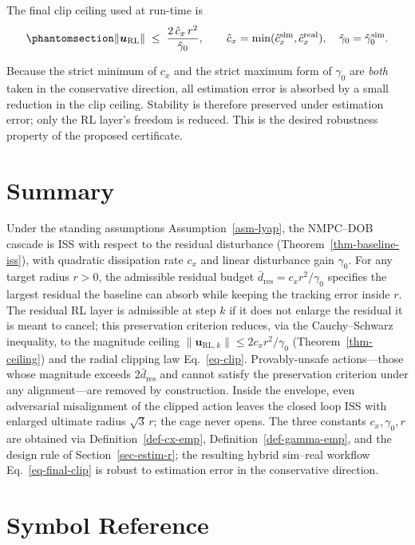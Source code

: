 \documentclass[
  11pt,
]{article}
\theoremstyle{plain}
\theoremstyle{plain}
\theoremstyle{definition}
\theoremstyle{remark}
\begin{document}
The final clip ceiling used at run-time is
\begin{equation}\protect\phantomsection\label{eq-final-clip}{
\|\bm{u}_{\mathrm{RL}}\|
\;\le\;
\frac{2\,\hat{c}_x\,r^2}{\hat{\gamma}_0},
\qquad
\hat{c}_x = \min(\hat{c}_x^{\mathrm{sim}}, \hat{c}_x^{\mathrm{real}}),
\quad
\hat{\gamma}_0 = \hat{\gamma}_0^{\mathrm{sim}}.
}\end{equation}

Because the strict minimum of \(c_x\) and the strict maximum form of
\(\gamma_0\) are \emph{both} taken in the conservative direction, all
estimation error is absorbed by a small reduction in the clip ceiling.
Stability is therefore preserved under estimation error; only the RL
layer's freedom is reduced. This is the desired robustness property of
the proposed certificate.

\section{Summary}\label{sec-summary}

Under the standing assumptions Assumption~\ref{asm-lyap}, the NMPC--DOB
cascade is ISS with respect to the residual disturbance
(Theorem~\ref{thm-baseline-iss}), with quadratic dissipation rate
\(c_x\) and linear disturbance gain \(\gamma_0\). For any target radius
\(r > 0\), the admissible residual budget
\(\bar{d}_{\mathrm{res}} = c_x r^2/\gamma_0\) specifies the largest
residual the baseline can absorb while keeping the tracking error inside
\(r\). The residual RL layer is admissible at step \(k\) if it does not
enlarge the residual it is meant to cancel; this preservation criterion
reduces, via the Cauchy--Schwarz inequality, to the magnitude ceiling
\(\|\bm{u}_{\mathrm{RL},k}\| \le 2 c_x r^2/\gamma_0\)
(Theorem~\ref{thm-ceiling}) and the radial clipping law
Eq.~\ref{eq-clip}. Provably-unsafe actions---those whose magnitude
exceeds \(2\bar{d}_{\mathrm{res}}\) and cannot satisfy the preservation
criterion under any alignment---are removed by construction. Inside the
envelope, even adversarial misalignment of the clipped action leaves the
closed loop ISS with enlarged ultimate radius \(\sqrt{3}\,r\); the cage
never opens. The three constants \(c_x,
\gamma_0, r\) are obtained via Definition~\ref{def-cx-emp},
Definition~\ref{def-gamma-emp}, and the design rule of
Section~\ref{sec-estim-r}; the resulting hybrid sim--real workflow
Eq.~\ref{eq-final-clip} is robust to estimation error in the
conservative direction.

\section{Symbol Reference}\label{symbol-reference}
\end{document}
